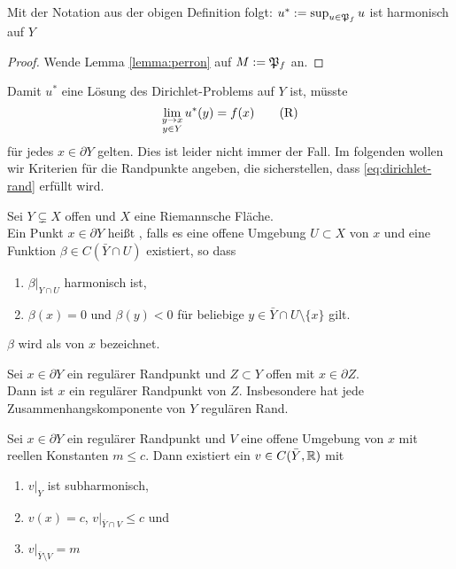\begin{cor}
  Mit der Notation aus der obigen Definition folgt: $u^\ast := \sup_{u
    \in \mathfrak{P}_f} u$ ist harmonisch auf $Y$
\end{cor}

\begin{proof}
  Wende Lemma \ref{lemma:perron} auf $M := \mathfrak{P}_f$ an.
\end{proof}

\begin{rem}
  Damit $u^\ast$ eine Lösung des Dirichlet-Problems auf $Y$ ist,
  müsste
  \[
  \lim_{\substack{y\rightarrow x\\y \in Y}}u^\ast(y) =
  f(x) \label{eq:dirichlet-rand} \tag{R}
  \]
  für jedes $x \in \partial Y$ gelten. Dies ist leider nicht immer der
  Fall. Im folgenden wollen wir Kriterien für die Randpunkte angeben,
  die sicherstellen, dass \eqref{eq:dirichlet-rand} erfüllt wird.
\end{rem}

\begin{defin}
  Sei $Y \subsetneq X$ offen und $X$ eine Riemannsche Fläche. \\
  Ein Punkt $x \in \partial Y$ heißt , falls es eine
  offene Umgebung $U \subset X$ von $x$ und eine Funktion $\beta  \in
  C(\bar Y \cap U)$ existiert, so dass
  \begin{enumerate}
  \item $\beta|_{Y \cap U}$ harmonisch ist,
  \item $\beta(x) =0$ und $\beta(y) < 0$ für beliebige $y \in \bar Y
    \cap U \setminus \{x\}$ gilt.
  \end{enumerate}
  $\beta$ wird als  von $x$ bezeichnet.
\end{defin}

\begin{cor}
  Sei $x \in \partial Y$ ein regulärer Randpunkt und $Z \subset Y$
  offen mit $x \in \partial Z$.\\
  Dann ist $x$ ein regulärer Randpunkt von $Z$. Insbesondere hat jede
  Zusammenhangskomponente von $Y$ regulären Rand.
\end{cor}


\begin{lemma}
  \label{lemma:regulär-trennen}
  Sei $x \in \partial Y$ ein regulärer Randpunkt und $V$ eine offene
  Umgebung von $x$ mit reellen Konstanten $m \leq c$. Dann existiert
  ein $v \in C( \bar Y, \mathbb{R})$ mit
  \begin{enumerate}
  \item $v|_Y$ ist subharmonisch,
  \item $v(x) = c$, $v|_{\bar Y \cap V} \leq c$ und
  \item $v|_{\bar Y\setminus V} = m$
  \end{enumerate}
\end{lemma}

